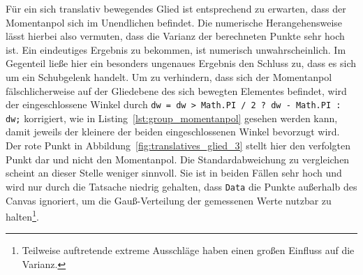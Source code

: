 Für ein sich translativ bewegendes Glied ist entsprechend zu erwarten, dass der Momentanpol sich im Unendlichen befindet.
Die numerische Herangehensweise lässt hierbei also vermuten, dass die Varianz der berechneten Punkte sehr hoch ist.
Ein eindeutiges Ergebnis zu bekommen, ist numerisch unwahrscheinlich.
Im Gegenteil lie{\ss}e hier ein besonders ungenaues Ergebnis den Schluss zu, dass es sich um ein Schubgelenk handelt.
Um zu verhindern, dass sich der Momentanpol fälschlicherweise auf der Gliedebene des sich bewegten Elementes befindet, wird der eingeschlossene Winkel durch \lstinline{dw = dw > Math.PI / 2 ? dw - Math.PI : dw;} korrigiert, wie in Listing~\ref{lst:group_momentanpol} gesehen werden kann, damit jeweils der kleinere der beiden eingeschlossenen Winkel bevorzugt wird.
Der rote Punkt in Abbildung~\ref{fig:translatives_glied_3} stellt hier den verfolgten Punkt dar und nicht den Momentanpol.
Die Standardabweichung zu vergleichen scheint an dieser Stelle weniger sinnvoll.
Sie ist in beiden Fällen sehr hoch und wird nur durch die Tatsache niedrig gehalten, dass \lstinline{Data} die Punkte au{\ss}erhalb des Canvas ignoriert, um die Gau{\ss}-Verteilung der gemessenen Werte nutzbar zu halten\footnote{Teilweise auftretende extreme Ausschläge haben einen gro{\ss}en Einfluss auf die Varianz.}.

